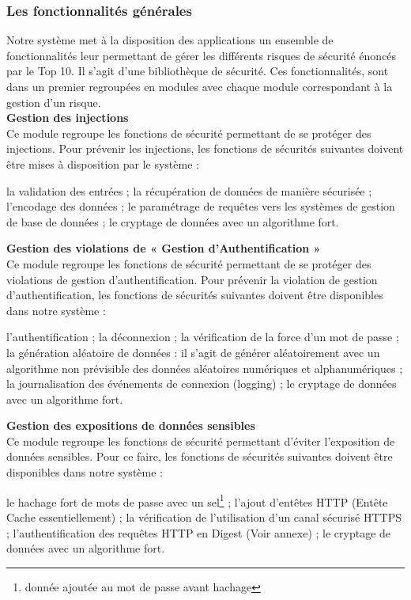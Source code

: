 \subsubsection{Les fonctionnalités générales}
Notre système met à la disposition des applications un ensemble de fonctionnalités leur permettant de gérer les différents risques de sécurité énoncés par le Top 10. Il s'agit d'une bibliothèque de sécurité. Ces fonctionnalités, sont dans un premier regroupées en modules avec chaque module correspondant à la gestion d'un risque.\\

\textbf{\RIGHTarrow Gestion des injections}\\
Ce module regroupe les fonctions de sécurité permettant de se protéger des injections. Pour prévenir les injections, les fonctions de sécurités suivantes doivent être mises à disposition par le système : 
\begin{itemize}
	\itemcheck la validation des entrées ; 
	\itemcheck la récupération de données de manière sécurisée ; 
	\itemcheck l’encodage des données ; 
	\itemcheck le paramétrage de requêtes vers les systèmes de gestion de base de données ; 
	\itemcheck le cryptage de données avec un algorithme fort.\\
\end{itemize}

\textbf{\RIGHTarrow Gestion des violations de « Gestion d’Authentification »}\\
Ce module regroupe les fonctions de sécurité permettant de se protéger des violations de gestion d'authentification. Pour prévenir la violation de gestion d'authentification, les fonctions de sécurités suivantes doivent être disponibles dans notre système :
\begin{itemize}
	\itemcheck l'authentification ;
	\itemcheck la déconnexion ;
	\itemcheck la vérification de la force d'un mot de passe ; 
	\itemcheck la génération aléatoire de données : il s'agit de générer aléatoirement avec un algorithme non prévisible des données aléatoires numériques et alphanumériques ; 
	\itemcheck la journalisation des événements de connexion (logging) ; 
	\itemcheck le cryptage de données avec un algorithme fort.\\
\end{itemize}

\textbf{\RIGHTarrow Gestion des expositions de données sensibles}\\
Ce module regroupe les fonctions de sécurité permettant d'éviter l'exposition de données sensibles. Pour ce faire, les fonctions de sécurités suivantes doivent être disponibles dans notre système :
\begin{itemize}
	\itemcheck le hachage fort de mots de passe avec un sel\footnote{donnée ajoutée au mot de passe avant hachage} ;
	\itemcheck l'ajout d'entêtes HTTP (Entête Cache essentiellement) ;
	\itemcheck la vérification de l'utilisation d'un canal sécurisé HTTPS ;
	\itemcheck l'authentification des requêtes HTTP en Digest (Voir annexe) ;
	\itemcheck le cryptage de données avec un algorithme fort.\\
\end{itemize}

